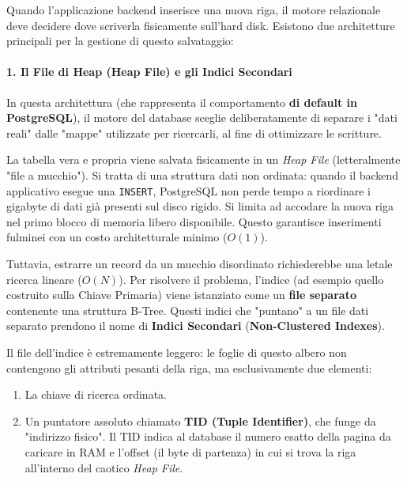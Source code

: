 Quando l'applicazione backend inserisce una nuova riga, il motore relazionale deve decidere dove scriverla fisicamente sull'hard disk. Esistono due architetture principali per la gestione di questo salvataggio:

\paragraph{1. Il File di Heap (Heap File) e gli Indici Secondari}
In questa architettura (che rappresenta il comportamento \textbf{di default in PostgreSQL}), il motore del database sceglie deliberatamente di separare i "dati reali" dalle "mappe" utilizzate per ricercarli, al fine di ottimizzare le scritture.

La tabella vera e propria viene salvata fisicamente in un \textit{Heap File} (letteralmente "file a mucchio"). Si tratta di una struttura dati non ordinata: quando il backend applicativo esegue una \texttt{INSERT}, PostgreSQL non perde tempo a riordinare i gigabyte di dati già presenti sul disco rigido. Si limita ad accodare la nuova riga nel primo blocco di memoria libero disponibile. Questo garantisce inserimenti fulminei con un costo architetturale minimo ($O(1)$).

Tuttavia, estrarre un record da un mucchio disordinato richiederebbe una letale ricerca lineare ($O(N)$). Per risolvere il problema, l'indice (ad esempio quello costruito sulla Chiave Primaria) viene istanziato come un \textbf{file separato} contenente una struttura B-Tree.
Questi indici che "puntano" a un file dati separato prendono il nome di \textbf{Indici Secondari} (\textbf{Non-Clustered Indexes}).

Il file dell'indice è estremamente leggero: le foglie di questo albero non contengono gli attributi pesanti della riga, ma esclusivamente due elementi:
\begin{enumerate}
    \item La chiave di ricerca ordinata.
    \item Un puntatore assoluto chiamato \textbf{TID (Tuple Identifier)}, che funge da "indirizzo fisico". Il TID indica al database il numero esatto della pagina da caricare in RAM e l'offset (il byte di partenza) in cui si trova la riga all'interno del caotico \textit{Heap File}.
\end{enumerate}


